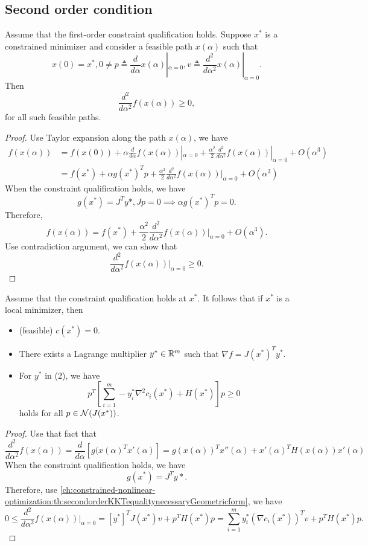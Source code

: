 \begin{refsection}
\subsection{Second order condition}
\begin{theorem}\cite[lec 4]{Robinson2015nonlinear2}\label{ch:constrained-nonlinear-optimization:th:secondorderKKTequalitynecessaryGeometricform}
Assume that the first-order constraint qualification holds. Suppose $x^*$ is a constrained minimizer and consider a feasible path $x(\alpha)$ such that
$$x(0) = x^*, 0\neq p \triangleq \frac{d}{d\alpha}x(\alpha)|_{\alpha = 0}, v\triangleq \frac{d^2}{d\alpha^2}x(\alpha)|_{\alpha = 0}.$$
Then
$$\frac{d^2}{d\alpha^2}f(x(\alpha)) \geq 0,$$
for all such feasible paths. 
\end{theorem}
\begin{proof}
Use Taylor expansion along the path $x(\alpha)$, we have
\begin{align*}
f(x(\alpha)) &= f(x(0)) + \alpha \frac{d}{d\alpha} f(x(\alpha))|_{\alpha = 0} + \frac{\alpha^2}{2}\frac{d^2}{d\alpha^2}f(x(\alpha))|_{\alpha = 0} + O(\alpha^3)\\
&=f(x^*) + \alpha g(x^*)^Tp + \frac{\alpha^2}{2}\frac{d^2}{d\alpha^2}f(x(\alpha))|_{\alpha = 0} + O(\alpha^3)
\end{align*}
When the constraint qualification holds, we have 
$$g(x^*) = J^Ty*, Jp = 0 \implies \alpha g(x^*)^Tp = 0.$$
Therefore, 
$$f(x(\alpha)) = f(x^*) + \frac{\alpha^2}{2}\frac{d^2}{d\alpha^2}f(x(\alpha))|_{\alpha = 0} + O(\alpha^3).$$
Use contradiction argument, we can show that 
$$\frac{d^2}{d\alpha^2}f(x(\alpha))|_{\alpha = 0} \geq 0.$$
\end{proof}




\begin{theorem}\label{ch:constrained-nonlinear-optimization:th:secondorderKKTequalitynecessary}
Assume that the constraint qualification holds at $x^*$. It follows that if $x^*$ is a local minimizer, then
\begin{itemize}
\item (feasible) $c(x^*) = 0$.
\item There exists a Lagrange multiplier $y^*\in \mathbb{R}^m$ such that $\nabla f = J(x^*)^Ty^*$.
\item For $y^*$ in (2), we have
$$p^T[\sum_{i=1}^m -y_i^* \nabla^2 c_i(x^*) + H(x^*)]p \geq 0$$
holds for all $p\in \mathcal{N}(J(x^*))$.   
\end{itemize}	
\end{theorem}
\begin{proof}
Use that fact that
$$\frac{d^2}{d\alpha^2}f(x(\alpha)) = \frac{d}{d\alpha}[g(x(\alpha)^Tx'(\alpha)] = g(x(\alpha))^Tx''(\alpha) + x'(\alpha)^TH(x(\alpha))x'(\alpha)$$
When the constraint qualification holds,  we have 
$$g(x^*) = J^Ty*.$$
Therefore, use \autoref{ch:constrained-nonlinear-optimization:th:secondorderKKTequalitynecessaryGeometricform}, we have
$$ 0 \leq \frac{d^2}{d\alpha^2}f(x(\alpha))|_{\alpha = 0} = [y^*]^TJ(x^*)v + p^TH(x^*)p = \sum_{i=1}^m y_i^*(\nabla c_i(x^*))^Tv + p^TH(x^*)p.$$


\end{proof}
\end{refsection}
